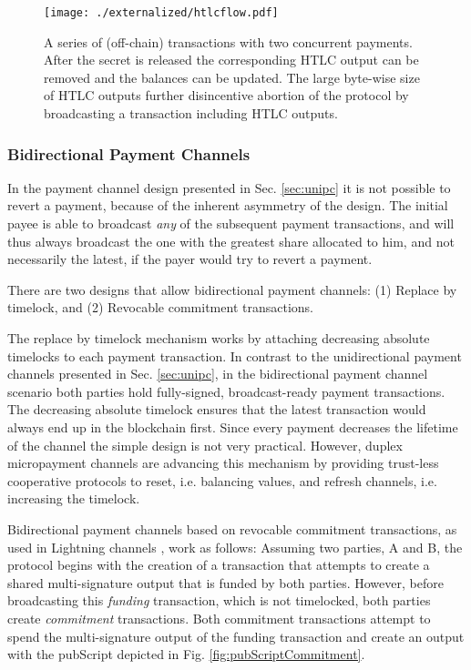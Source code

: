 \begin{figure}
\centering
\texttt{[image: ./externalized/htlcflow.pdf]}
\caption{A series of (off-chain) transactions with two concurrent payments. After the secret is released the corresponding HTLC output can be removed and the balances can be updated. The large byte-wise size of HTLC outputs further disincentive abortion of the protocol by broadcasting a transaction including HTLC outputs.}
\label{fig:htlcflow}
\end{figure}

\subsubsection{Bidirectional Payment Channels}

In the payment channel design presented in Sec. \ref{sec:unipc} it is not possible to revert a payment, because of the inherent asymmetry of the design. The initial payee is able to broadcast \emph{any} of the subsequent payment transactions, and will thus always broadcast the one with the greatest share allocated to him, and not necessarily the latest, if the payer would try to revert a payment. 

There are two designs that allow bidirectional payment channels: (1) Replace by timelock, and (2) Revocable commitment transactions.

The replace by timelock mechanism works by attaching decreasing absolute timelocks to each payment transaction. In contrast to the unidirectional payment channels presented in Sec. \ref{sec:unipc}, in the bidirectional payment channel scenario both parties hold fully-signed, broadcast-ready payment transactions. The decreasing absolute timelock ensures that the latest transaction would always end up in the blockchain first. Since every payment decreases the lifetime of the channel the simple design is not very practical. However, duplex micropayment channels \parencite{decker2015Duplex} are advancing this mechanism by providing trust-less cooperative protocols to reset, i.e. balancing values, and refresh channels, i.e. increasing the timelock. 

Bidirectional payment channels based on revocable commitment transactions, as used in Lightning channels \parencite{poonbitcoin},  work as follows:
Assuming two parties, A and B, the protocol begins with the creation of a transaction that attempts to create a shared multi-signature output that is funded by both parties. However, before broadcasting this \emph{funding} transaction, which is not timelocked, both parties create \emph{commitment} transactions. Both commitment transactions attempt to spend the multi-signature output of the funding transaction and create an output with the pubScript depicted in Fig. \ref{fig:pubScriptCommitment}.

